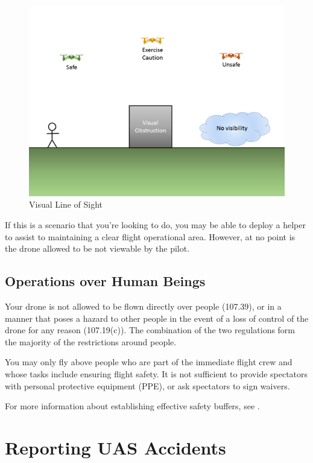 \documentclass[
]{book}
\begin{document}
\begin{figure}

{\centering \includegraphics[width=0.8\linewidth]{images/VLOS_G} 

}

\caption{Visual Line of Sight}\label{fig:vlos}
\end{figure}

If this is a scenario that you're looking to do, you may be able to deploy a helper to assist to maintaining a clear flight operational area. However, at no point is the drone allowed to be not viewable by the pilot.

\hypertarget{operations-over-human-beings}{%
\section{Operations over Human Beings}\label{operations-over-human-beings}}

Your drone is not allowed to be flown directly over people (107.39), or in a manner that poses a hazard to other people in the event of a loss of control of the drone for any reason (107.19(c)). The combination of the two regulations form the majority of the restrictions around people.

You may only fly above people who are part of the immediate flight crew and whose tasks include ensuring flight safety. It is not sufficient to provide spectators with personal protective equipment (PPE), or ask spectators to sign waivers.

For more information about establishing effective safety buffers, see .

\hypertarget{ch-uas-accident}{%
\chapter{Reporting UAS Accidents}\label{ch-uas-accident}}
\end{document}
